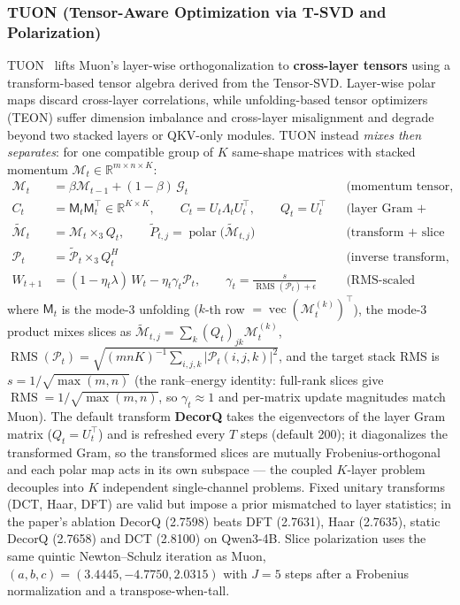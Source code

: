 \subsubsection{TUON (Tensor-Aware Optimization via T-SVD and Polarization)}
TUON~\citep{tang_tuon_2026} lifts Muon's layer-wise orthogonalization to
\textbf{cross-layer tensors} using a transform-based tensor algebra derived from the
Tensor-SVD. Layer-wise polar maps discard cross-layer correlations, while
unfolding-based tensor optimizers (TEON) suffer dimension imbalance and cross-layer
misalignment and degrade beyond two stacked layers or QKV-only modules. TUON instead
\emph{mixes then separates}: for one compatible group of $K$ same-shape matrices with
stacked momentum $\mathcal{M}_t \in \mathbb{R}^{m \times n \times K}$:
\begin{align}
\mathcal{M}_t &= \beta \mathcal{M}_{t-1} + (1-\beta)\, \mathcal{G}_t
  && \text{(momentum tensor, Alg.~1 line 2)} \\
C_t &= \mathsf{M}_t \mathsf{M}_t^{\top} \in \mathbb{R}^{K \times K}, \qquad
C_t = U_t \Lambda_t U_t^{\top}, \qquad Q_t = U_t^{\top}
  && \text{(layer Gram + eigendecomposition, lines 3--5)} \\
\widetilde{\mathcal{M}}_t &= \mathcal{M}_t \times_3 Q_t, \qquad
\widetilde{P}_{t,j} = \operatorname{polar}\!\big(\widetilde{\mathcal{M}}_{t,j}\big)
  && \text{(transform + slice polarization, lines 6--9)} \\
\mathcal{P}_t &= \widetilde{\mathcal{P}}_t \times_3 Q_t^{H}
  && \text{(inverse transform, line 10)} \\
W_{t+1} &= (1 - \eta_t \lambda)\, W_t - \eta_t \gamma_t \mathcal{P}_t, \qquad
\gamma_t = \frac{s}{\operatorname{RMS}(\mathcal{P}_t) + \epsilon}
  && \text{(RMS-scaled update, line 11)}
\end{align}
where $\mathsf{M}_t$ is the mode-3 unfolding ($k$-th row
$= \operatorname{vec}(\mathcal{M}_t^{(k)})^{\top}$), the mode-3 product mixes slices as
$\widetilde{\mathcal{M}}_{t,j} = \sum_k (Q_t)_{jk} \mathcal{M}_t^{(k)}$,
$\operatorname{RMS}(\mathcal{P}_t) = \sqrt{(mnK)^{-1} \sum_{i,j,k} |\mathcal{P}_t(i,j,k)|^2}$,
and the target stack RMS is $s = 1/\sqrt{\max(m,n)}$ (the rank--energy identity: full-rank
slices give $\operatorname{RMS} = 1/\sqrt{\max(m,n)}$, so $\gamma_t \approx 1$ and
per-matrix update magnitudes match Muon). The default transform \textbf{DecorQ} takes the
eigenvectors of the layer Gram matrix ($Q_t = U_t^{\top}$) and is refreshed every $T$
steps (default 200); it diagonalizes the transformed Gram, so the transformed slices are
mutually Frobenius-orthogonal and each polar map acts in its own subspace --- the coupled
$K$-layer problem decouples into $K$ independent single-channel problems. Fixed unitary
transforms (DCT, Haar, DFT) are valid but impose a prior mismatched to layer statistics;
in the paper's ablation DecorQ (2.7598) beats DFT (2.7631), Haar (2.7635), static DecorQ
(2.7658) and DCT (2.8100) on Qwen3-4B. Slice polarization uses the same quintic
Newton--Schulz iteration as Muon, $(a,b,c) = (3.4445, -4.7750, 2.0315)$ with $J = 5$
steps after a Frobenius normalization and a transpose-when-tall.


